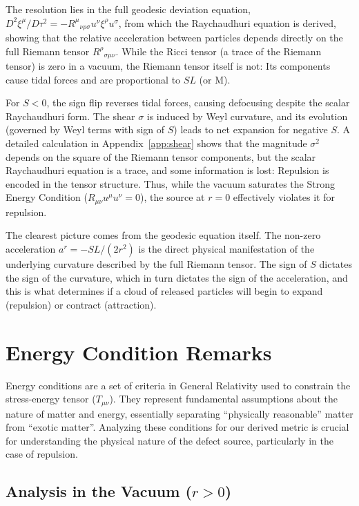 \documentclass[%
  reprint,
  superscriptaddress,
  showpacs,
  showkeys,
  amsmath,amssymb,
  pra,
  longbibliography,
  floatfix,
]{revtex4-2}
\begin{document}
The resolution lies in the full geodesic deviation equation, $D^2 \xi^\mu / D\tau^2 = - R^\mu{}_{\nu\rho\sigma} u^\nu \xi^\rho u^\sigma$, from which the Raychaudhuri equation is derived, showing that the relative acceleration between particles depends directly on the full Riemann tensor $R^\rho{}_{\sigma\mu\nu}$. While the Ricci tensor (a trace of the Riemann tensor) is zero in a vacuum, the Riemann tensor itself is not: Its components cause tidal forces and are proportional to $S L$ (or M).

For $S<0$, the sign flip reverses tidal forces, causing defocusing despite the scalar Raychaudhuri form. The shear $\sigma$ is induced by Weyl curvature, and its evolution (governed by Weyl terms with sign of $S$) leads to net expansion for negative $S$. A detailed calculation in Appendix~\ref{app:shear} shows that the magnitude $\sigma^2$ depends on the square of the Riemann tensor components, but the scalar Raychaudhuri equation is a trace, and some information is lost: Repulsion is encoded in the tensor structure. Thus, while the vacuum saturates the Strong Energy Condition ($R_{\mu\nu} u^\mu u^\nu =0$), the source at $r=0$ effectively violates it for repulsion.

The clearest picture comes from the geodesic equation itself. The non-zero acceleration $a^r = -SL/(2r^2)$ is the direct physical manifestation of the underlying curvature described by the full Riemann tensor. The sign of $S$ dictates the sign of the curvature, which in turn dictates the sign of the acceleration, and this is what determines if a cloud of released particles will begin to expand (repulsion) or contract (attraction).

\section{Energy Condition Remarks}
\label{sec:energy}

Energy conditions are a set of criteria in General Relativity used to constrain the stress-energy tensor ($T_{\mu\nu}$). They represent fundamental assumptions about the nature of matter and energy, essentially separating ``physically reasonable'' matter from ``exotic matter''. Analyzing these conditions for our derived metric is crucial for understanding the physical nature of the defect source, particularly in the case of repulsion.

\subsection{Analysis in the Vacuum ($r > 0$)}
\end{document}
